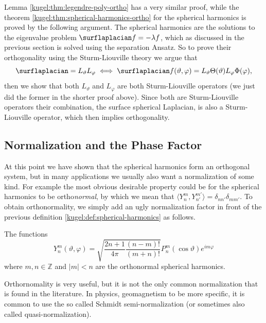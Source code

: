 Lemma \ref{kugel:thm:legendre-poly-ortho} has a very similar proof, while the
theorem \ref{kugel:thm:spherical-harmonics-ortho} for the spherical harmonics is
proved by the following argument.  The spherical harmonics are the solutions to
the eigenvalue problem $\surflaplacian f = -\lambda f$, which as discussed in
the previous section is solved using the separation Ansatz. So to prove their
orthogonality using the Sturm-Liouville theory we argue that
\begin{equation*}
  \surflaplacian = L_\vartheta L_\varphi \iff
  \surflaplacian f(\vartheta, \varphi)
    = L_\vartheta \Theta(\vartheta) L_\varphi \Phi(\varphi),
\end{equation*}
then we show that both $L_\vartheta$ and $L_\varphi$ are both Sturm-Liouville
operators (we just did the former in the shorter proof above). Since both are
Sturm-Liouville operators their combination, the surface spherical Laplacian, is
also a Sturm-Liouville operator, which then implies orthogonality.

\subsection{Normalization and the Phase Factor}

At this point we have shown that the spherical harmonics form an orthogonal
system, but in many applications we usually also want a normalization of some
kind. For example the most obvious desirable property could be for the spherical
harmonics to be ortho\emph{normal}, by which we mean that $\langle Y^m_n,
Y^{m'}_{n'} \rangle = \delta_{nn'} \delta_{mm'}$. To obtain orthonormality, we
simply add an ugly normalization factor in front of the previous definition
\ref{kugel:def:spherical-harmonics} as follows.

\begin{definition}
  \label{kugel:def:spherical-harmonics-orthonormal}
  The functions
  \begin{equation*}
    Y^m_n(\vartheta, \varphi)
    = \sqrt{\frac{2n + 1}{4\pi} \frac{(n-m)!}{(m+n)!}}
      P^m_n(\cos \vartheta) e^{im\varphi}
  \end{equation*}
  where $m, n \in \mathbb{Z}$ and $|m| < n$ are the orthonormal spherical
  harmonics.
\end{definition}

Orthornomality is very useful, but it is not the only common normalization that
is found in the literature. In physics, geomagnetism to be more specific, it is
common to use the so called Schmidt semi-normalization (or sometimes also called
quasi-normalization).


